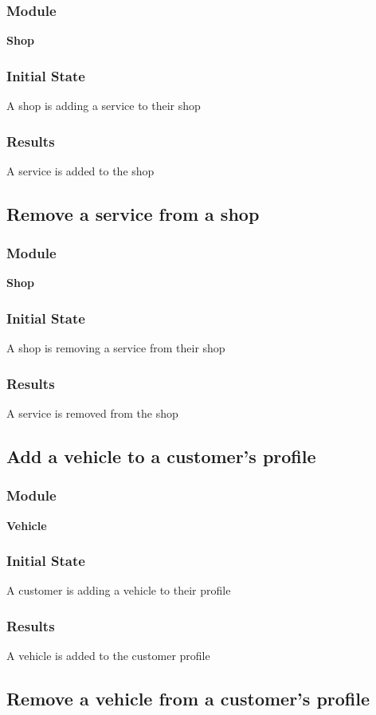 \documentclass[12pt, titlepage]{article}
\begin{document}
    \subsubsection{Module}
    \textbf{Shop}
    \subsubsection{Initial State}
    A shop is adding a service to their shop
    \subsubsection{Results}
    A service is added to the shop

\subsection{Remove a service from a shop}
    \subsubsection{Module}
    \textbf{Shop}
    \subsubsection{Initial State}
    A shop is removing a service from their shop
    \subsubsection{Results}
    A service is removed from the shop

\subsection{Add a vehicle to a customer's profile}
    \subsubsection{Module}
    \textbf{Vehicle}
    \subsubsection{Initial State}
    A customer is adding a vehicle to their profile
    \subsubsection{Results}
    A vehicle is added to the customer profile

\subsection{Remove a vehicle from a customer's profile}
\end{document}
